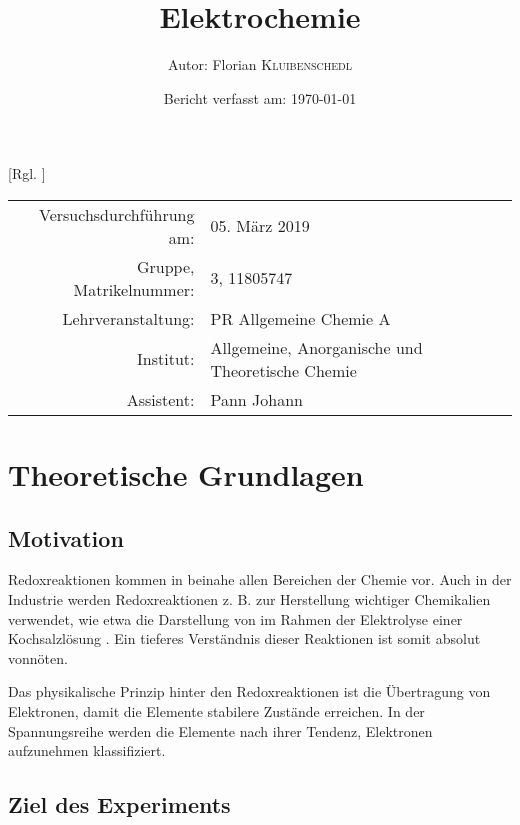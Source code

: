 \documentclass{article}
\title{Elektrochemie \cite{Versuchsvorschrift}} %
\author{Autor: Florian \textsc{Kluibenschedl}} %
\date{Bericht verfasst am: \today} %
\begin{document}
  [Rgl. ]{}{}
  
  \maketitle %
  
  \begin{center}
    \begin{tabular}{r p{4cm}}
      Versuchsdurchführung am: & 05. März 2019\\ %
      Gruppe, Matrikelnummer: & 3, 11805747 \\
      Lehrveranstaltung: & PR Allgemeine Chemie A \\
      Institut: & Allgemeine, Anorganische und Theoretische Chemie \\
      Assistent: & Pann Johann %
    \end{tabular}
  \end{center}


  \begin{abstract}
    
  \end{abstract}
  
  \pagebreak
  
  \section{Theoretische Grundlagen}
  
    \subsection{Motivation} \label{sec:Motivation}
      
      Redoxreaktionen kommen in beinahe allen Bereichen der Chemie vor. Auch in der Industrie werden Redoxreaktionen z. B. zur Herstellung wichtiger Chemikalien verwendet, wie etwa die Darstellung von  im Rahmen der Elektrolyse einer Kochsalzlösung \cite{NaOHDarstellung}. Ein tieferes Verständnis dieser Reaktionen ist somit absolut vonnöten. 
      
      Das physikalische Prinzip hinter den Redoxreaktionen ist die Übertragung von Elektronen, damit die Elemente stabilere Zustände erreichen. In der Spannungsreihe werden die Elemente nach ihrer Tendenz, Elektronen aufzunehmen klassifiziert. 
  
    \subsection{Ziel des Experiments}
    
\end{document}
